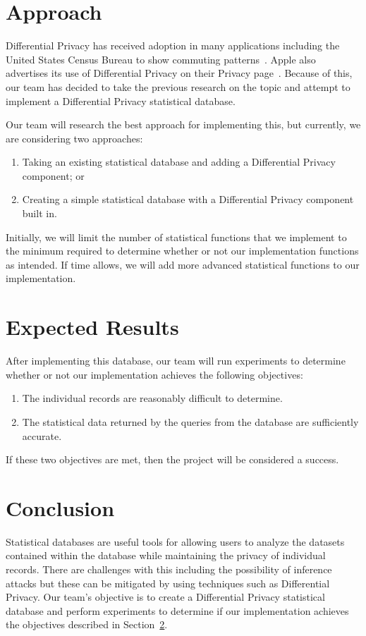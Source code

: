 \documentclass[12pt]{IEEEtran}
\begin{document}
\section{Approach}
Differential Privacy has received adoption in many applications including the
United States Census Bureau to show commuting
patterns~\cite{Machanavajjhala:2008}. Apple also advertises its use of
Differential Privacy on their Privacy page~\cite{Apple:2017}. Because of this,
our team has decided to take the previous research on the topic and attempt to
implement a Differential Privacy statistical database.

Our team will research the best approach for implementing this, but currently,
we are considering two approaches:
\begin{enumerate}
    \item Taking an existing statistical database and adding a Differential
        Privacy component; or
    \item Creating a simple statistical database with a Differential Privacy
        component built in.
\end{enumerate}

Initially, we will limit the number of statistical functions that we implement
to the minimum required to determine whether or not our implementation functions
as intended. If time allows, we will add more advanced statistical functions to
our implementation.

\section{Expected Results}
\label{expected-res}
After implementing this database, our team will run experiments to determine
whether or not our implementation achieves the following objectives:
\begin{enumerate}
    \item The individual records are reasonably difficult to determine.
    \item The statistical data returned by the queries from the database are
        sufficiently accurate.
\end{enumerate}
If these two objectives are met, then the project will be considered a success.

\section{Conclusion}
Statistical databases are useful tools for allowing users to analyze the
datasets contained within the database while maintaining the privacy of
individual records. There are challenges with this including the possibility of
inference attacks but these can be mitigated by using techniques such as
Differential Privacy. Our team's objective is to create a Differential Privacy
statistical database and perform experiments to determine if our implementation
achieves the objectives described in Section~\ref{expected-res}.

\printbibliography
\end{document}

